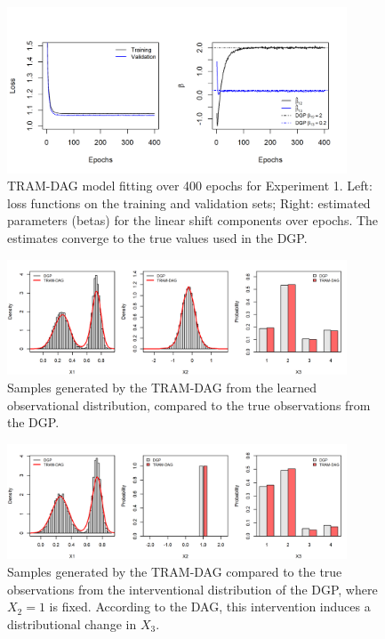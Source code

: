 \begin{figure}[htbp]
\centering
\includegraphics[width=0.9\textwidth]{img/exp1_loss_parameters.png}
\caption{TRAM-DAG model fitting over 400 epochs for Experiment 1. Left: loss functions on the training and validation sets; Right: estimated parameters (betas) for the linear shift components over epochs. The estimates converge to the true values used in the DGP.}
\label{fig:exp1_loss_parameters}
\end{figure}



\begin{figure}[htbp]
\centering
\includegraphics[width=0.9\textwidth]{img/exp1_observational_distribution.png}
\caption{Samples generated by the TRAM-DAG from the learned observational distribution, compared to the true observations from the DGP.}
\label{fig:exp1_observational_distribution}
\end{figure}




\begin{figure}[htbp]
\centering
\includegraphics[width=0.9\textwidth]{img/exp1_interventional_distribution.png}
\caption{Samples generated by the TRAM-DAG compared to the true observations from the interventional distribution of the DGP, where $X_2 = 1$ is fixed. According to the DAG, this intervention induces a distributional change in $X_3$.}
\label{fig:exp1_interventional_distribution}
\end{figure}



